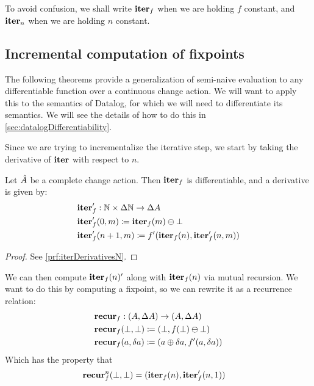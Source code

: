 To avoid confusion, we shall write $\textbf{iter}_f$ when we are holding $f$ constant,
and $\textbf{iter}_n$ when we are holding $n$ constant.

\subsection{Incremental computation of fixpoints}

The following theorems provide a
generalization of semi-naive evaluation to any differentiable function over a
continuous change action. We will want to apply this to the semantics of
Datalog, for which we will need to differentiate its semantics. We will see the
details of how to do this in \cref{sec:datalogDifferentiability}.

Since we are trying to incrementalize the iterative step, we start by taking the
derivative of $\textbf{iter}$ with respect to $n$.

\begin{prop}[name=Derivative of the iteration map with respect to $n$, restate=iterDerivativesN]
  \label{prop:iterDerivativesN}
  Let $\hat{A}$ be a complete change action. Then $\textbf{iter}_f$ is differentiable, and a derivative is given by:
  \begin{align*}
    &\textbf{iter}_f': \mathbb{N} \times \Delta \mathbb{N} \rightarrow \Delta A\\
    &\textbf{iter}_f'(0, m) \coloneqq \textbf{iter}_f(m) \ominus \bot\\
    &\textbf{iter}_f'(n+1, m) \coloneqq f'(\textbf{iter}_f(n), \textbf{iter}_f'(n, m))
  \end{align*}
\end{prop}
\ifproofs
\begin{proof}
  See \cref{prf:iterDerivativesN}.
\end{proof}
\fi

We can then compute $\textbf{iter}_f(n)'$ along with $\textbf{iter}_f(n)$ via mutual recursion.
We want to do this by computing a fixpoint, so we can rewrite it as a recurrence
relation:
\begin{align*}
  &\textbf{recur}_f : (A, \Delta A) \rightarrow (A, \Delta A)\\
  &\textbf{recur}_f (\bot, \bot) \coloneqq (\bot, f(\bot) \ominus \bot)\\
  &\textbf{recur}_f (a, \delta a) \coloneqq (a \oplus \delta a, f'(a, \delta a))
\end{align*}
Which has the property that
\begin{align*}
  &\textbf{recur}_f^n (\bot, \bot) = (\textbf{iter}_f(n), \textbf{iter}_f'(n, 1))
\end{align*}

